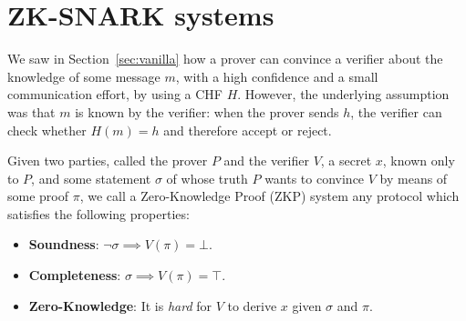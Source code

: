 \section{ZK-SNARK systems}\label{sec:zksnark}
We saw in Section~\ref{sec:vanilla} how a prover can convince a verifier about the knowledge of
some message \(m\), with a high confidence and a small communication effort, by using a CHF \(H\).
However, the underlying assumption was that \(m\) is known by the verifier: when the prover sends
\(h\), the verifier can check whether \(H(m) = h\) and therefore accept or reject.
\begin{definition}
	Given two parties, called the prover \(P\) and the verifier \(V\), a secret \(x\), known only to
	\(P\), and some statement \(\sigma \) of whose truth \(P\) wants to convince \(V\) by means of
	some proof \(\pi \), we call a Zero-Knowledge Proof (ZKP) system any protocol which satisfies the
	following properties:
	\begin{itemize}
		\item \textbf{Soundness}: \(\neg{\sigma} \implies V(\pi) = \bot \).
		\item \textbf{Completeness}: \(\sigma \implies V(\pi) = \top \).
		\item \textbf{Zero-Knowledge}: It is \emph{hard} for \(V\) to derive \(x\) given \(\sigma \)
		      and \(\pi \).
	\end{itemize}
\end{definition}


